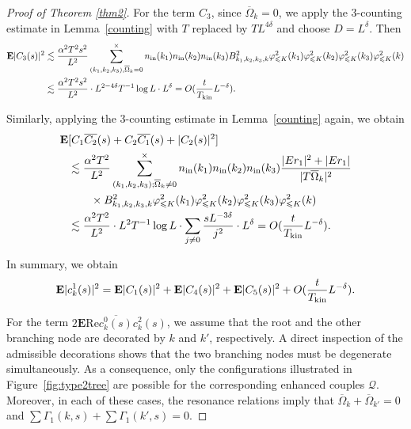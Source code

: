 \documentclass[UTF-8,reqno]{amsart}
\numberwithin{equation}{section}
\theoremstyle{definition}
\def\geq{\geqslant}
\def\leq{\leqslant}
\def\geq{\geqslant}
\def\leq{\leqslant}
\begin{document}
\begin{proof}[Proof of Theorem \ref{thm2}]
For the term $C_3$, since $\overline \Omega_k=0$, we apply the 3-counting estimate in Lemma~\ref{counting} with $T$ replaced by $T L^{4\delta}$ and choose $D=L^\delta$. Then
\begin{align*}
   \mathbf{E}|C_3(s)|^2 &\lesssim \frac{\alpha^2 T^2s^2}{L^{2}} \sum\limits_{(k_1,k_2, k_{3}),\overline \Omega_k= 0}^{\times}  n_{\mathrm{in}}(k_1)n_{\mathrm{in}}(k_2)n_{\mathrm{in}}(k_3)
B^2_{k_1,k_2,k_3,k}\varphi_{\leq K}^2(k_1)\varphi_{\leq K}^2(k_2)\varphi_{\leq K}^2(k_3)\varphi_{\leq K}^2(k)\notag\\
   &\lesssim \frac{\alpha^2 T^2s^2}{L^{2}}\cdot  L^{2-4\delta}T^{-1}\log L\cdot L^\delta=O(\frac{t}{T_{\rm kin}}L^{-\delta}).
\end{align*}


Similarly, applying the 3-counting estimate in Lemma~\ref{counting} again, we obtain
\begin{align*}
\mathbf{E}&[C_1\overline{C_2}(s)+C_2\overline{C_1}(s)+|C_2(s)|^2]\\
&\lesssim\frac{\alpha^2T^2}{L^{2}}\sum_{(k_1, k_2, k_3); \overline \Omega_k\neq 0}^\times n_{\mathrm{in}}(k_1)n_{\mathrm{in}}(k_2)n_{\mathrm{in}}(k_3)\frac{|Er_1|^2+|Er_1|}{|T\overline \Omega_k|^2} \notag\\
&\quad \quad \times B^2_{k_1,k_2,k_3,k}\varphi_{\leq K}^2(k_1)\varphi_{\leq K}^2(k_2)\varphi_{\leq K}^2(k_3)\varphi_{\leq K}^2(k)\\
&\lesssim\frac{\alpha^2T^2}{L^{2}} \cdot L^{2}T^{-1}\log L\cdot \sum_{j\neq 0}\frac{sL^{-3\delta}}{j^2}\cdot L^\delta=O(\frac{t}{T_{\rm kin}}L^{-\delta}).
\end{align*}

 
In summary, we obtain
\begin{align*}
     \mathbf{E}|c^1_k(s)|^2=\mathbf{E}|C_1(s)|^2+\mathbf{E}|C_4(s)|^2+\mathbf{E}|C_5(s)|^2+O(\frac{t}{T_{\rm kin}}L^{-\delta}).
\end{align*}


For the term $2\mathbf{E}\mathrm{Re}\overline{c^0_k(s)}c^2_k(s)$, we assume that the root and the other branching node are decorated by $k$ and $k'$, respectively. A direct inspection of the admissible decorations shows that the two branching nodes must be degenerate simultaneously. As a consequence, only the configurations illustrated in Figure~\ref{fig:type2tree} are possible for the corresponding enhanced couples $\mathcal{Q}$.
Moreover, in each of these cases, the resonance relations imply that  $\overline \Omega_k+\overline \Omega_{k'}=0$ and $\sum\Gamma_1(k,s)+\sum\Gamma_1(k',s)=0$.


\end{proof}
\end{document}

